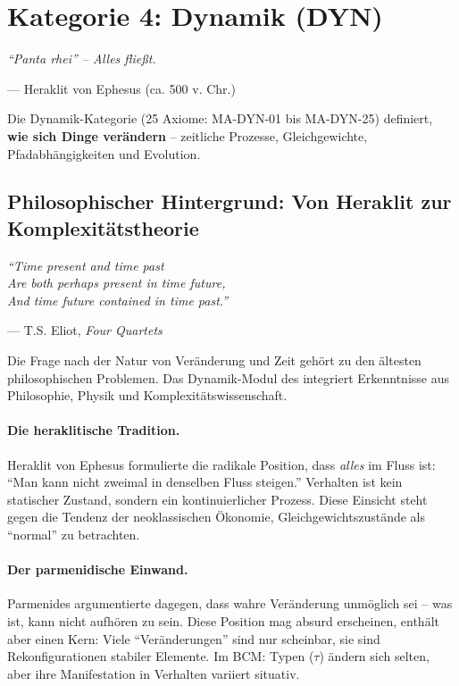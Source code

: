 \section{Kategorie 4: Dynamik (DYN)}

\epigraph{\textit{``Panta rhei'' -- Alles fließt.}}{--- Heraklit von Ephesus (ca. 500 v. Chr.)}

Die Dynamik-Kategorie (25 Axiome: MA-DYN-01 bis MA-DYN-25) definiert, \textbf{wie sich Dinge verändern} -- zeitliche Prozesse, Gleichgewichte, Pfadabhängigkeiten und Evolution.

\subsection{Philosophischer Hintergrund: Von Heraklit zur Komplexitätstheorie}

\epigraph{\textit{``Time present and time past\\
Are both perhaps present in time future,\\
And time future contained in time past.''}}{--- T.S. Eliot, \textit{Four Quartets}}

Die Frage nach der Natur von Veränderung und Zeit gehört zu den ältesten philosophischen Problemen. Das Dynamik-Modul des \META{} integriert Erkenntnisse aus Philosophie, Physik und Komplexitätswissenschaft.

\paragraph{Die heraklitische Tradition.}
Heraklit von Ephesus formulierte die radikale Position, dass \textit{alles} im Fluss ist: ``Man kann nicht zweimal in denselben Fluss steigen.'' Verhalten ist kein statischer Zustand, sondern ein kontinuierlicher Prozess. Diese Einsicht steht gegen die Tendenz der neoklassischen Ökonomie, Gleichgewichtszustände als ``normal'' zu betrachten.

\paragraph{Der parmenidische Einwand.}
Parmenides argumentierte dagegen, dass wahre Veränderung unmöglich sei -- was ist, kann nicht aufhören zu sein. Diese Position mag absurd erscheinen, enthält aber einen Kern: Viele ``Veränderungen'' sind nur scheinbar, sie sind Rekonfigurationen stabiler Elemente. Im BCM: Typen ($\tau$) ändern sich selten, aber ihre Manifestation in Verhalten variiert situativ.

